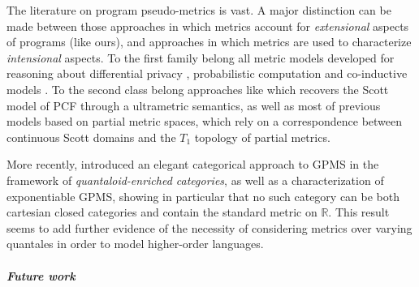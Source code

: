The literature on program pseudo-metrics is vast. A major distinction can be made between those approaches in which metrics account for \emph{extensional} aspects of programs (like ours), 
 and approaches in which metrics are used to characterize \emph{intensional} aspects.
To the first family belong all metric models developed for reasoning about differential privacy \cite{},  
probabilistic computation \cite{} and co-inductive models \cite{}.
To the second class belong approaches like \cite{} which recovers the Scott model of PCF through a ultrametric semantics, as well as most of previous models based on partial metric spaces, which rely on a correspondence between continuous Scott domains and the $T_{1}$ topology of partial metrics.
%
%


More recently, \cite{Stubbe} introduced an elegant categorical approach to GPMS in the framework of \emph{quantaloid-enriched categories}, as well as a 
characterization of exponentiable GPMS, showing in particular that no such category can be both cartesian closed categories and contain the standard metric on $\mathbb R$. This result seems to add further evidence of the necessity of considering metrics over varying quantales in order to model higher-order languages. 
%






\subparagraph*{Future work}


